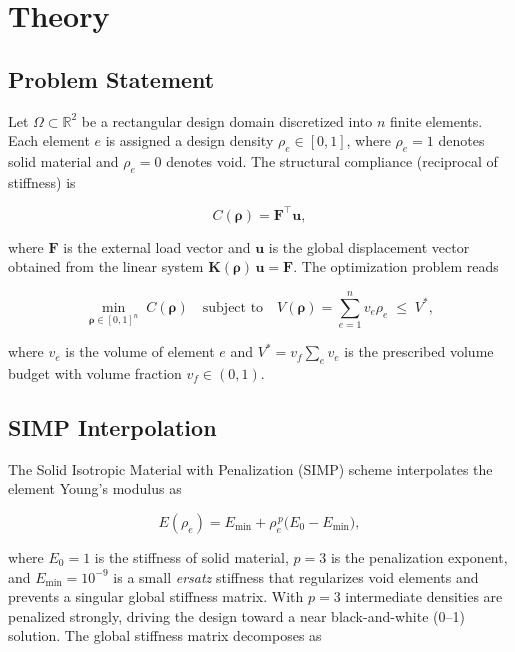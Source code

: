 \documentclass[11pt,a4paper]{article}
\begin{document}
\section{Theory}
\label{sec:theory}

\subsection{Problem Statement}

Let $\Omega \subset \mathbb{R}^2$ be a rectangular design domain
discretized into $n$ finite elements.  Each element $e$ is assigned a
design density $\rho_e \in [0,1]$, where $\rho_e = 1$ denotes solid
material and $\rho_e = 0$ denotes void.  The structural compliance
(reciprocal of stiffness) is

\begin{equation}
  C(\boldsymbol{\rho}) = \mathbf{F}^{\!\top} \mathbf{u},
  \label{eq:compliance}
\end{equation}

\noindent where $\mathbf{F}$ is the external load vector and $\mathbf{u}$
is the global displacement vector obtained from the linear system
$\mathbf{K}(\boldsymbol{\rho})\,\mathbf{u} = \mathbf{F}$.  The
optimization problem reads

\begin{equation}
  \min_{\boldsymbol{\rho} \in [0,1]^n} \; C(\boldsymbol{\rho})
  \quad \text{subject to} \quad
  V(\boldsymbol{\rho}) = \sum_{e=1}^{n} v_e \rho_e \;\leq\; V^*,
  \label{eq:problem}
\end{equation}

\noindent where $v_e$ is the volume of element $e$ and $V^* = v_f
\sum_e v_e$ is the prescribed volume budget with volume fraction
$v_f \in (0,1)$.

\subsection{SIMP Interpolation}
\label{sec:simp}

The Solid Isotropic Material with Penalization (SIMP) scheme interpolates
the element Young's modulus as

\begin{equation}
  E(\rho_e) = E_{\min} + \rho_e^{\,p}\bigl(E_0 - E_{\min}\bigr),
  \label{eq:simp}
\end{equation}

\noindent where $E_0 = 1$ is the stiffness of solid material, $p = 3$ is
the penalization exponent, and $E_{\min} = 10^{-9}$ is a small \emph{ersatz}
stiffness that regularizes void elements and prevents a singular global
stiffness matrix.  With $p = 3$ intermediate densities are penalized
strongly, driving the design toward a near black-and-white (0--1) solution.
The global stiffness matrix decomposes as
\end{document}
